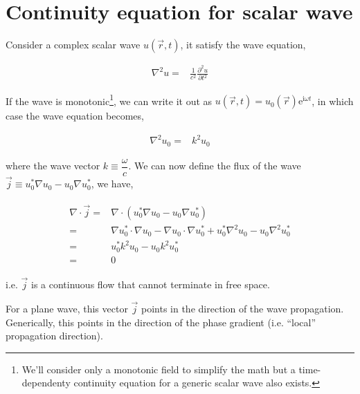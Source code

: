 \documentclass[10pt,fleqn]{article}
\newcommand{\ue}{\mathrm{e}}
\newcommand{\ui}{\mathrm{i}}
\newcommand{\eqar}[1]
{
  \begin{align}
    #1
  \end{align}
}
\newcommand{\paren}[1]{{\left({#1}\right)}}
\newcommand{\pdiff}[3][{}]{{\frac{\partial^{#1} {#2}}{\partial {#3}{}^{#1}}}}
\begin{document}
\section{Continuity equation for scalar wave}
\label{app:wave-flux}
Consider a complex scalar wave $u(\vec r, t)$, it satisfy the wave equation,
\eqar{
  \nabla^2u=&\frac{1}{c^2}\pdiff[2]{u}{t}
}
If the wave is monotonic\footnote{
  We'll consider only a monotonic field to simplify the math but a time-dependenty
  continuity equation for a generic scalar wave also exists.},
we can write it out as $u(\vec r, t)=u_0(\vec r)\ue^{\ui\omega t}$,
in which case the wave equation becomes,
\eqar{
  \nabla^2u_0=&k^2 u_0
}
where the wave vector $k\equiv\dfrac{\omega}{c}$.
We can now define the flux of the wave $\vec j\equiv u_0^*\nabla u_0-u_0\nabla u_0^*$,
we have,
\eqar{
  \begin{split}
    \nabla\cdot\vec j=&\nabla\cdot\paren{u_0^*\nabla u_0-u_0\nabla u_0^*}\\
    =&\nabla u_0^*\cdot\nabla u_0-\nabla u_0\cdot\nabla u_0^*+u_0^*\nabla^2 u_0-u_0\nabla^2 u_0^*\\
    =&u_0^*k^2 u_0-u_0k^2 u_0^*\\
    =&0
  \end{split}
}
i.e. $\vec j$ is a continuous flow that cannot terminate in free space.

For a plane wave, this vector $\vec j$ points in the direction of the wave propagation.
Generically, this points in the direction of the phase gradient
(i.e. ``local'' propagation direction).\\
\end{document}
